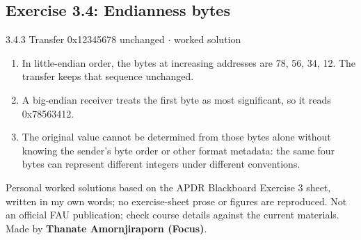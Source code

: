 \documentclass[11pt]{article}
\begin{document}
\begin{keepsection}\subsection{Exercise 3.4: Endianness bytes}

\begin{workedbox}{3.4.3 Transfer 0x12345678 unchanged \ensuremath{\cdot} worked solution}
\begin{enumerate}
\item In little-endian order, the bytes at increasing addresses are 78, 56, 34, 12. The transfer keeps that sequence unchanged.
\item A big-endian receiver treats the first byte as most significant, so it reads 0x78563412.
\item The original value cannot be determined from those bytes alone without knowing the sender’s byte order or other format metadata: the same four bytes can represent different integers under different conventions.
\end{enumerate}
\end{workedbox}

\end{keepsection}

\vfill{\small Personal worked solutions based on the APDR Blackboard Exercise 3 sheet, written in my own words; no exercise-sheet prose or figures are reproduced. Not an official FAU publication; check course details against the current materials. Made by \textbf{Thanate Amornjiraporn (Focus)}.}
\end{document}
